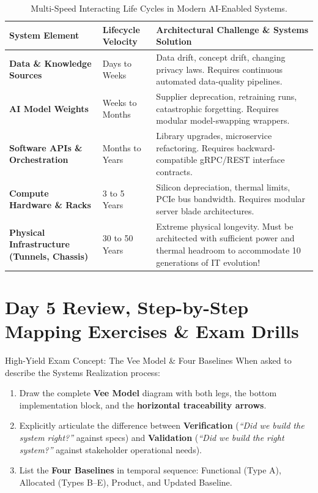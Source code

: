 \begin{table}[htbp]
\centering
\small
\renewcommand{\arraystretch}{1.3}
\begin{tabularx}{\textwidth}{lp{4cm}X}
\toprule
\textbf{System Element} & \textbf{Lifecycle Velocity} & \textbf{Architectural Challenge \& Systems Solution} \\
\midrule
\textbf{Data \& Knowledge Sources} & Days to Weeks & Data drift, concept drift, changing privacy laws. Requires continuous automated data-quality pipelines. \\
\textbf{AI Model Weights} & Weeks to Months & Supplier deprecation, retraining runs, catastrophic forgetting. Requires modular model-swapping wrappers. \\
\textbf{Software APIs \& Orchestration} & Months to Years & Library upgrades, microservice refactoring. Requires backward-compatible gRPC/REST interface contracts. \\
\textbf{Compute Hardware \& Racks} & 3 to 5 Years & Silicon depreciation, thermal limits, PCIe bus bandwidth. Requires modular server blade architectures. \\
\textbf{Physical Infrastructure (Tunnels, Chassis)} & 30 to 50 Years & Extreme physical longevity. Must be architected with sufficient power and thermal headroom to accommodate 10 generations of IT evolution! \\
\bottomrule
\end{tabularx}
\caption{Multi-Speed Interacting Life Cycles in Modern AI-Enabled Systems.}
\label{tab:ai_multispeed}
\end{table}

\section{Day 5 Review, Step-by-Step Mapping Exercises \& Exam Drills}
\label{sec:day5_exercises}

\begin{examprepbox}{High-Yield Exam Concept: The Vee Model \& Four Baselines}
When asked to describe the Systems Realization process:
\begin{enumerate}[leftmargin=1.5em]
    \item Draw the complete \textbf{Vee Model} diagram with both legs, the bottom implementation block, and the \textbf{horizontal traceability arrows}.
    \item Explicitly articulate the difference between \textbf{Verification} (\textit{``Did we build the system right?''} against specs) and \textbf{Validation} (\textit{``Did we build the right system?''} against stakeholder operational needs).
    \item List the \textbf{Four Baselines} in temporal sequence: Functional (Type A), Allocated (Types B--E), Product, and Updated Baseline.
\end{enumerate}
\end{examprepbox}

